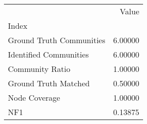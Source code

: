 \begin{tabular}{lr}
\toprule
{} &    Value \\
Index                    &          \\
\midrule
Ground Truth Communities &  6.00000 \\
Identified Communities   &  6.00000 \\
Community Ratio          &  1.00000 \\
Ground Truth Matched     &  0.50000 \\
Node Coverage            &  1.00000 \\
NF1                      &  0.13875 \\
\bottomrule
\end{tabular}
